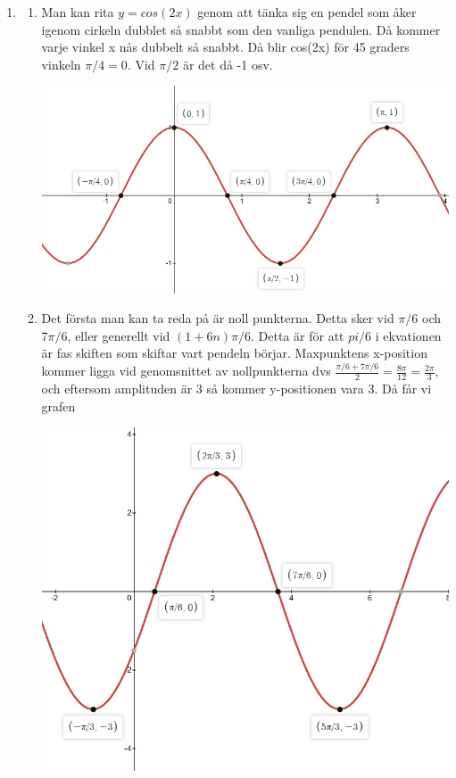 \documentclass[a4paper,12pt]{article}
\begin{document}
\begin{enumerate}
      \item
            \begin{enumerate}
                  \item Man kan rita $y=cos(2x)$ genom att tänka sig en pendel som åker igenom cirkeln dubblet
                        så snabbt som den vanliga pendulen. Då kommer varje vinkel x nås dubbelt så snabbt. Då blir
                        cos(2x) för 45 graders vinkeln $\pi/4=0$. Vid $\pi/2$ är det då -1 osv.

                        \includegraphics[scale=0.5]{Figur2.png}

                  \item Det första man kan ta reda på är noll punkterna. Detta sker vid $\pi/6$ och $7\pi/6$,
                        eller generellt vid $(1+6n)\pi/6$.
                        Detta är för att $pi/6$ i ekvationen är fas skiften som skiftar vart pendeln börjar.
                        Maxpunktens x-position kommer ligga vid genomsnittet
                        av nollpunkterna dvs $\frac{\pi/6+7\pi/6}{2}=\frac{8\pi}{12}=\frac{2\pi}{3}$, och eftersom
                        amplituden är 3 så kommer y-positionen vara 3. Då får vi grafen

                        \includegraphics[scale=0.5]{Figur3.png}
            \end{enumerate}


\end{enumerate}
\end{document}
